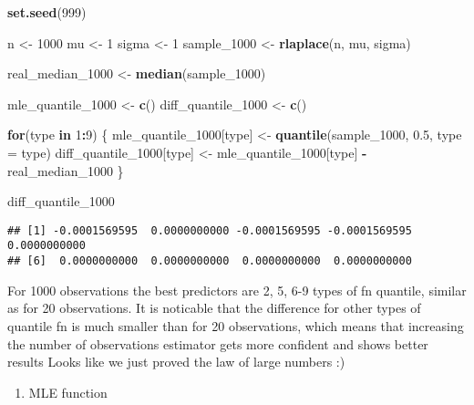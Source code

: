 \documentclass[
]{article}
\newenvironment{Shaded}{\begin{snugshade}}{\end{snugshade}}
\newcommand{\AttributeTok}[1]{\textcolor[rgb]{0.13,0.29,0.53}{#1}}
\newcommand{\ControlFlowTok}[1]{\textcolor[rgb]{0.13,0.29,0.53}{\textbf{#1}}}
\newcommand{\DecValTok}[1]{\textcolor[rgb]{0.00,0.00,0.81}{#1}}
\newcommand{\FloatTok}[1]{\textcolor[rgb]{0.00,0.00,0.81}{#1}}
\newcommand{\FunctionTok}[1]{\textcolor[rgb]{0.13,0.29,0.53}{\textbf{#1}}}
\newcommand{\NormalTok}[1]{#1}
\newcommand{\OtherTok}[1]{\textcolor[rgb]{0.56,0.35,0.01}{#1}}
\newcommand{\SpecialCharTok}[1]{\textcolor[rgb]{0.81,0.36,0.00}{\textbf{#1}}}
\providecommand{\tightlist}{%
  \setlength{\itemsep}{0pt}\setlength{\parskip}{0pt}}
\begin{document}
\begin{Shaded}
\begin{Highlighting}[]
\FunctionTok{set.seed}\NormalTok{(}\DecValTok{999}\NormalTok{)}

\NormalTok{n }\OtherTok{\textless{}{-}} \DecValTok{1000}
\NormalTok{mu }\OtherTok{\textless{}{-}} \DecValTok{1}
\NormalTok{sigma }\OtherTok{\textless{}{-}} \DecValTok{1}
\NormalTok{sample\_1000 }\OtherTok{\textless{}{-}} \FunctionTok{rlaplace}\NormalTok{(n, mu, sigma)}

\NormalTok{real\_median\_1000 }\OtherTok{\textless{}{-}} \FunctionTok{median}\NormalTok{(sample\_1000)}

\NormalTok{mle\_quantile\_1000 }\OtherTok{\textless{}{-}} \FunctionTok{c}\NormalTok{()}
\NormalTok{diff\_quantile\_1000 }\OtherTok{\textless{}{-}} \FunctionTok{c}\NormalTok{()}

\ControlFlowTok{for}\NormalTok{(type }\ControlFlowTok{in} \DecValTok{1}\SpecialCharTok{:}\DecValTok{9}\NormalTok{) \{}
\NormalTok{  mle\_quantile\_1000[type] }\OtherTok{\textless{}{-}} \FunctionTok{quantile}\NormalTok{(sample\_1000, }\FloatTok{0.5}\NormalTok{, }\AttributeTok{type =}\NormalTok{ type)}
\NormalTok{  diff\_quantile\_1000[type] }\OtherTok{\textless{}{-}}\NormalTok{ mle\_quantile\_1000[type] }\SpecialCharTok{{-}}\NormalTok{ real\_median\_1000}
\NormalTok{\}}

\NormalTok{diff\_quantile\_1000}
\end{Highlighting}
\end{Shaded}

\begin{verbatim}
## [1] -0.0001569595  0.0000000000 -0.0001569595 -0.0001569595  0.0000000000
## [6]  0.0000000000  0.0000000000  0.0000000000  0.0000000000
\end{verbatim}

For 1000 observations the best predictors are 2, 5, 6-9 types of fn
quantile, similar as for 20 observations. It is noticable that the
difference for other types of quantile fn is much smaller than for 20
observations, which means that increasing the number of observations
estimator gets more confident and shows better results Looks like we
just proved the law of large numbers :)

\begin{enumerate}
\def\labelenumi{\alph{enumi}.}
\setcounter{enumi}{2}
\tightlist
\item
  MLE function
\end{enumerate}
\end{document}
